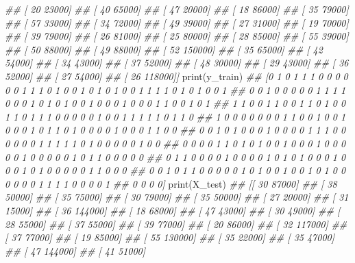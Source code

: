 \documentclass[
]{book}
\newenvironment{Shaded}{\begin{snugshade}}{\end{snugshade}}
\newcommand{\BuiltInTok}[1]{#1}
\newcommand{\CommentTok}[1]{\textcolor[rgb]{0.56,0.35,0.01}{\textit{#1}}}
\newcommand{\NormalTok}[1]{#1}
\theoremstyle{definition}
\theoremstyle{definition}
\theoremstyle{definition}
\theoremstyle{definition}
\theoremstyle{remark}
\begin{document}
\begin{Shaded}
\begin{Highlighting}[]
\CommentTok{\#\#  [    20  23000]}
\CommentTok{\#\#  [    40  65000]}
\CommentTok{\#\#  [    47  20000]}
\CommentTok{\#\#  [    18  86000]}
\CommentTok{\#\#  [    35  79000]}
\CommentTok{\#\#  [    57  33000]}
\CommentTok{\#\#  [    34  72000]}
\CommentTok{\#\#  [    49  39000]}
\CommentTok{\#\#  [    27  31000]}
\CommentTok{\#\#  [    19  70000]}
\CommentTok{\#\#  [    39  79000]}
\CommentTok{\#\#  [    26  81000]}
\CommentTok{\#\#  [    25  80000]}
\CommentTok{\#\#  [    28  85000]}
\CommentTok{\#\#  [    55  39000]}
\CommentTok{\#\#  [    50  88000]}
\CommentTok{\#\#  [    49  88000]}
\CommentTok{\#\#  [    52 150000]}
\CommentTok{\#\#  [    35  65000]}
\CommentTok{\#\#  [    42  54000]}
\CommentTok{\#\#  [    34  43000]}
\CommentTok{\#\#  [    37  52000]}
\CommentTok{\#\#  [    48  30000]}
\CommentTok{\#\#  [    29  43000]}
\CommentTok{\#\#  [    36  52000]}
\CommentTok{\#\#  [    27  54000]}
\CommentTok{\#\#  [    26 118000]]}
\BuiltInTok{print}\NormalTok{(y\_train)}
\CommentTok{\#\# [0 1 0 1 1 1 0 0 0 0 0 0 1 1 1 0 1 0 0 1 0 1 0 1 0 0 1 1 1 1 0 1 0 1 0 0 1}
\CommentTok{\#\#  0 0 1 0 0 0 0 0 1 1 1 1 0 0 0 1 0 1 0 1 0 0 1 0 0 0 1 0 0 0 1 1 0 0 1 0 1}
\CommentTok{\#\#  1 1 0 0 1 1 0 0 1 1 0 1 0 0 1 1 0 1 1 1 0 0 0 0 0 1 0 0 1 1 1 1 1 0 1 1 0}
\CommentTok{\#\#  1 0 0 0 0 0 0 0 1 1 0 0 1 0 0 1 0 0 0 1 0 1 1 0 1 0 0 0 0 1 0 0 0 1 1 0 0}
\CommentTok{\#\#  0 0 1 0 1 0 0 0 1 0 0 0 0 1 1 1 0 0 0 0 0 0 1 1 1 1 1 0 1 0 0 0 0 0 1 0 0}
\CommentTok{\#\#  0 0 0 0 1 1 0 1 0 1 0 0 1 0 0 0 1 0 0 0 0 0 1 0 0 0 0 0 1 0 1 1 0 0 0 0 0}
\CommentTok{\#\#  0 1 1 0 0 0 0 1 0 0 0 0 1 0 1 0 1 0 0 0 1 0 0 0 1 0 1 0 0 0 0 0 1 1 0 0 0}
\CommentTok{\#\#  0 0 1 0 1 1 0 0 0 0 0 1 0 1 0 0 1 0 0 1 0 1 0 0 0 0 0 0 1 1 1 1 0 0 0 0 1}
\CommentTok{\#\#  0 0 0 0]}
\BuiltInTok{print}\NormalTok{(X\_test)}
\CommentTok{\#\# [[    30  87000]}
\CommentTok{\#\#  [    38  50000]}
\CommentTok{\#\#  [    35  75000]}
\CommentTok{\#\#  [    30  79000]}
\CommentTok{\#\#  [    35  50000]}
\CommentTok{\#\#  [    27  20000]}
\CommentTok{\#\#  [    31  15000]}
\CommentTok{\#\#  [    36 144000]}
\CommentTok{\#\#  [    18  68000]}
\CommentTok{\#\#  [    47  43000]}
\CommentTok{\#\#  [    30  49000]}
\CommentTok{\#\#  [    28  55000]}
\CommentTok{\#\#  [    37  55000]}
\CommentTok{\#\#  [    39  77000]}
\CommentTok{\#\#  [    20  86000]}
\CommentTok{\#\#  [    32 117000]}
\CommentTok{\#\#  [    37  77000]}
\CommentTok{\#\#  [    19  85000]}
\CommentTok{\#\#  [    55 130000]}
\CommentTok{\#\#  [    35  22000]}
\CommentTok{\#\#  [    35  47000]}
\CommentTok{\#\#  [    47 144000]}
\CommentTok{\#\#  [    41  51000]}

\end{Highlighting}
\end{Shaded}
\end{document}
